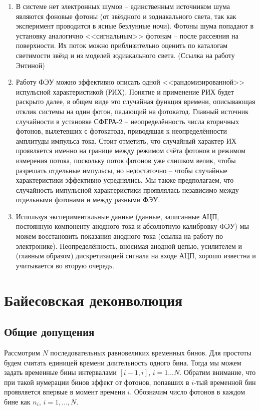 \documentclass[12pt]{book}
\begin{document}
	\begin{enumerate}
		\item В системе нет электронных шумов -- единственным источником шума являются фоновые фотоны (от звёздного и зодиакального света, так как эксперимент проводится в ясные безлунные ночи). Фотоны шума попадают в установку аналогично <<сигнальным>> фотонам -- после рассеяния на поверхности. Их поток можно приблизительно оценить по каталогам светимости звёзд и из моделей зодиакального света. (Ссылка на работу Энтиной)
		\item Работу ФЭУ можно эффективно описать одной <<рандомизированной>> испульсной характеристикой (РИХ). Понятие и применение РИХ будет раскрыто далее, в общем виде это случайная функция времени, описывающая отклик системы на один фотон, падающий на фотокатод. Главный источник случайности в установке СФЕРА-2 -- неопределённость числа вторичных фотонов, вылетевших с фотокатода, приводящая к неопределённости амплитуды импульса тока. Стоит отметить, что случайный характер ИХ проявляется именно на границе между режимом счёта фотонов и режимом измерения потока, поскольку поток фотонов уже слишком велик, чтобы разрешать отдельные импульсы, но недостаточно -- чтобы случайные характеристики эффективно усреднялись. Мы также предполагаем, что случайность импульсной характеристики проявлялась независимо между отдельными фотонами и между разными ФЭУ.
		\item Используя экспериментальные данные (данные, записанные АЦП, постоянную компоненту анодного тока и абсолютную калибровку ФЭУ) мы можем восстановить показания анодного тока (ссылка на работу по электронике). Неопределённость, вносимая анодной цепью, усилителем и (главным образом) дискретизацией сигнала на входе АЦП, хорошо известна и учитывается во вторую очередь.
	\end{enumerate}

	\chapter{Байесовская деконволюция}
	
	\section{Общие допущения}
	
	Рассмотрим $N$ последовательных равновеликих временных бинов. Для простоты будем считать единицей времени длительность одного бина. Тогда мы можем задать временные бины интервалами $[i-1, i]$, $i = 1 \ldots N$. Обратим внимание, что при такой нумерации бинов эффект от фотонов, попавших в $i$-тый временной бин проявляется впервые в момент времени $i$. Обозначим число фотонов в каждом бине как $n_i$, $i = 1, \ldots, N$.
\end{document}
